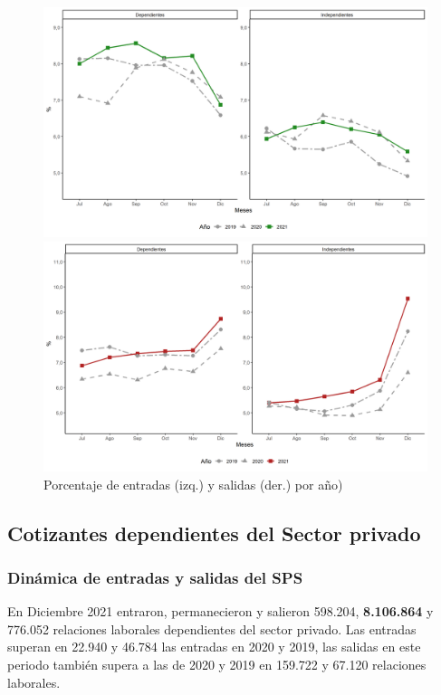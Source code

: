 \begin{figure}[!htbp]
\centering
\begin{minipage}{0.5\textwidth}
  \centering
  \includegraphics[width=\linewidth]{figures/02_longitudinal/entradas_anual_dependiente_independiente.png}
\end{minipage}%

\begin{minipage}{0.5\textwidth}
  \centering
  \includegraphics[width=\linewidth]{figures/02_longitudinal/salidas_anual_dependiente_independiente.png}
\end{minipage}
\caption{Porcentaje de entradas (izq.) y salidas (der.) por año)}
\label{figura:dependientes:entradas_salidas}
\end{figure}

\FloatBarrier
\subsection{Cotizantes dependientes del Sector privado}
\subsubsection{Dinámica de entradas y salidas del SPS}
En Diciembre 2021 entraron, permanecieron y salieron 598.204, \textbf{8.106.864} y 776.052 relaciones laborales dependientes del sector privado. Las entradas superan en 22.940 y 46.784 las entradas en 2020 y 2019, las salidas en este periodo también supera a las de 2020 y 2019 en 159.722 y 67.120 relaciones laborales. 

